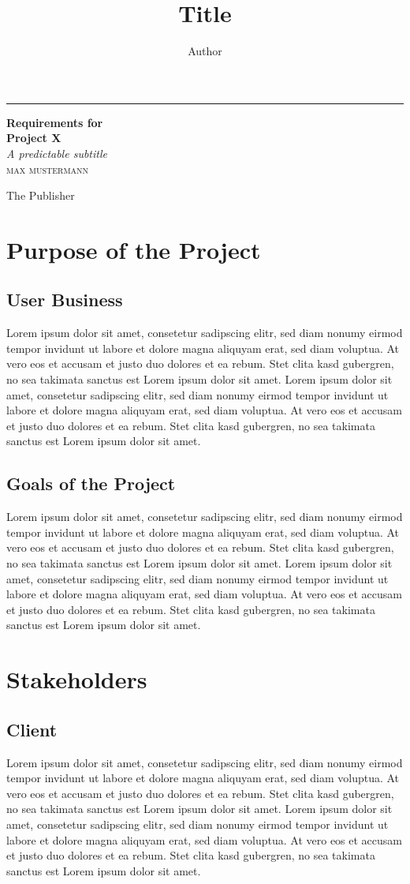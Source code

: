 \documentclass[a4paper, 12pt,twoside]{article}
\title{Title}
\author{Author}
\newcommand*{\plogo}{\fbox{$\mathcal{PL}$}}
\newcommand*{\pname}{Project X}
\newcommand{\lips}{Lorem ipsum dolor sit amet, consetetur sadipscing elitr, sed diam nonumy eirmod tempor invidunt ut labore et dolore magna aliquyam erat, sed diam voluptua. At vero eos et accusam et justo duo dolores et ea rebum. Stet clita kasd gubergren, no sea takimata sanctus est Lorem ipsum dolor sit amet. Lorem ipsum dolor sit amet, consetetur sadipscing elitr, sed diam nonumy eirmod tempor invidunt ut labore et dolore magna aliquyam erat, sed diam voluptua. At vero eos et accusam et justo duo dolores et ea rebum. Stet clita kasd gubergren, no sea takimata sanctus est Lorem ipsum dolor sit amet.}
\begin{document}
\begin{titlepage} %
	
	\raggedleft %
	
	\rule{1pt}{\textheight} %
	\hspace{0.05\textwidth} %
	\parbox[b]{0.75\textwidth}{ %
		
		{\Huge\bfseries Requirements for \\[0.5\baselineskip] \pname}\\[2\baselineskip] %
		{\large\textit{A predictable subtitle}}\\[4\baselineskip] %
		{\Large\textsc{max mustermann}} %
		
		\vspace{0.5\textheight} %
		
		{\noindent The Publisher~~\plogo}\\[\baselineskip] %
	}
	
\end{titlepage}

\tableofcontents

\begin{abstract}

\end{abstract}

\section{Purpose of the Project}
\subsection{User Business}
\lips
\subsection{Goals of the Project}
\lips
\section{Stakeholders}
\subsection{Client}
\lips
\end{document}
